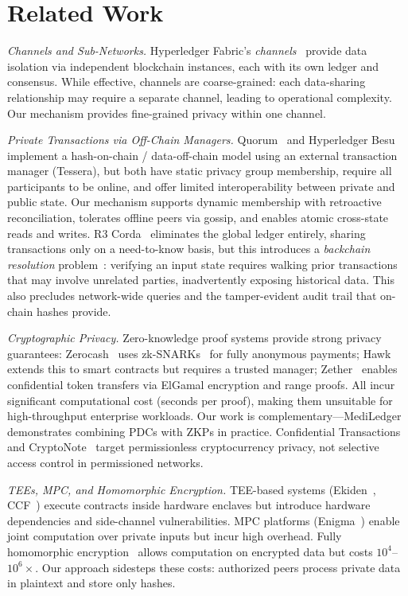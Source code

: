\section{Related Work}

\textit{Channels and Sub-Networks.}
Hyperledger Fabric's \textit{channels}~\cite{hf} provide data isolation via independent blockchain instances, each with its own ledger and consensus. While effective, channels are coarse-grained: each data-sharing relationship may require a separate channel, leading to operational complexity. Our mechanism provides fine-grained privacy within one channel.

\textit{Private Transactions via Off-Chain Managers.}
Quorum~\cite{Quorum} and Hyperledger Besu~\cite{besu} implement a hash-on-chain / data-off-chain model using an external transaction manager (Tessera), but both have static privacy group membership, require all participants to be online, and offer limited interoperability between private and public state. Our mechanism supports dynamic membership with retroactive reconciliation, tolerates offline peers via gossip, and enables atomic cross-state reads and writes. R3 Corda~\cite{corda} eliminates the global ledger entirely, sharing transactions only on a need-to-know basis, but this introduces a \textit{backchain resolution} problem~\cite{corda}: verifying an input state requires walking prior transactions that may involve unrelated parties, inadvertently exposing historical data. This also precludes network-wide queries and the tamper-evident audit trail that on-chain hashes provide.

\textit{Cryptographic Privacy.}
Zero-knowledge proof systems provide strong privacy guarantees: Zerocash~\cite{inproceedings} uses zk-SNARKs~\cite{10.5555/2671225.2671275} for fully anonymous payments; Hawk~\cite{7546538} extends this to smart contracts but requires a trusted manager; Zether~\cite{Bnz2019ZetherTP} enables confidential token transfers via ElGamal encryption and range proofs. All incur significant computational cost (seconds per proof), making them unsuitable for high-throughput enterprise workloads. Our work is complementary---MediLedger~\cite{mediledger-fda, mediledger-hf} demonstrates combining PDCs with ZKPs in practice. Confidential Transactions~\cite{maxwell} and CryptoNote~\cite{Saberhagen2013CryptoNoteV2} target permissionless cryptocurrency privacy, not selective access control in permissioned networks.

\textit{TEEs, MPC, and Homomorphic Encryption.}
TEE-based systems (Ekiden~\cite{ekiden}, CCF~\cite{ccf}) execute contracts inside hardware enclaves but introduce hardware dependencies and side-channel vulnerabilities. MPC platforms (Enigma~\cite{enigma}) enable joint computation over private inputs but incur high overhead. Fully homomorphic encryption~\cite{gentry-fhe} allows computation on encrypted data but costs $10^4$--$10^6\times$. Our approach sidesteps these costs: authorized peers process private data in plaintext and store only hashes.

